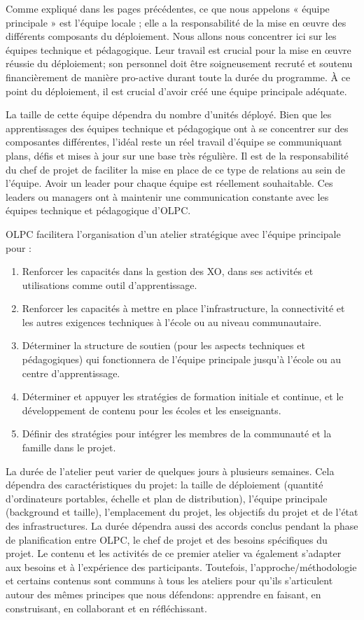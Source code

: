 \documentclass[11pt]{article}
\begin{document}

Comme expliqué dans les pages précédentes, ce que nous appelons « équipe
principale » est l'équipe locale ; elle a la responsabilité de la mise en
œuvre des différents composants du déploiement. Nous allons nous concentrer
ici sur les équipes technique et pédagogique. Leur travail est crucial pour
la mise en œuvre réussie du déploiement; son personnel doit être
soigneusement recruté et soutenu financièrement de manière pro-active
durant toute la durée du programme. À ce point du déploiement, il est
crucial d'avoir créé une équipe principale adéquate.

La taille de cette équipe dépendra du nombre d'unités déployé. Bien que les
apprentissages des équipes technique et pédagogique ont à se concentrer sur
des composantes différentes, l'idéal reste un réel travail d'équipe se
communiquant plans, défis et  mises à jour sur une base très régulière. Il
est de la responsabilité du chef de projet de faciliter la mise en place de
ce type de relations au sein de l’équipe. Avoir un leader pour chaque
équipe est réellement souhaitable. Ces leaders ou managers ont à maintenir
une communication constante avec les équipes technique et pédagogique
d’OLPC.

OLPC facilitera l'organisation d'un atelier stratégique avec l'équipe
principale pour :

\begin{enumerate}
\item Renforcer les capacités dans la gestion des XO, dans ses activités et
   utilisations comme outil d'apprentissage.
\item Renforcer les capacités à mettre en place l'infrastructure, la
   connectivité et les autres exigences techniques à l'école ou au niveau
   communautaire.
\item Déterminer la structure de soutien (pour les aspects techniques et
   pédagogiques) qui fonctionnera de l'équipe principale jusqu'à l'école ou
   au centre d'apprentissage.
\item Déterminer et appuyer les stratégies de formation initiale et continue,
   et le développement de contenu pour les écoles et les enseignants.
\item Définir des stratégies pour intégrer les membres de la communauté et la
   famille dans le projet.
\end{enumerate}

La durée de l'atelier peut varier de quelques jours à plusieurs
semaines. Cela dépendra des caractéristiques du projet: la taille de
déploiement (quantité d'ordinateurs portables, échelle et plan de
distribution), l'équipe principale (background et taille), l'emplacement du
projet, les objectifs du projet et de l'état des infrastructures. La durée
dépendra aussi des accords conclus pendant la phase de planification entre
OLPC, le chef de projet et des besoins spécifiques du projet. Le contenu et
les activités de ce premier atelier va également s'adapter aux besoins et à
l'expérience des participants. Toutefois, l'approche/méthodologie et
certains contenus sont communs à tous les ateliers pour qu'ils s'articulent
autour des mêmes principes que nous défendons: apprendre en faisant, en
construisant, en collaborant et en réfléchissant.
\end{document}
